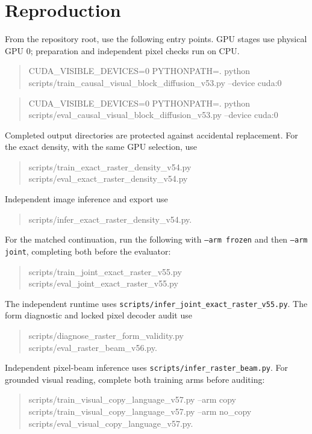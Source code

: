 \documentclass[10pt,a4paper]{article}
\begin{document}
\section*{Reproduction}
From the repository root, use the following entry points. GPU stages use
physical GPU 0; preparation and independent pixel checks run on CPU.
\begin{quote}\small\ttfamily
CUDA\_VISIBLE\_DEVICES=0 PYTHONPATH=. python\\
scripts/train\_causal\_visual\_block\_diffusion\_v53.py --device cuda:0
\end{quote}
\begin{quote}\small\ttfamily
CUDA\_VISIBLE\_DEVICES=0 PYTHONPATH=. python\\
scripts/eval\_causal\_visual\_block\_diffusion\_v53.py --device cuda:0
\end{quote}
Completed output directories are protected against accidental replacement.
For the exact density, with the same GPU selection, use
\begin{quote}\small\ttfamily
scripts/train\_exact\_raster\_density\_v54.py\\
scripts/eval\_exact\_raster\_density\_v54.py
\end{quote}
Independent image inference and export use
\begin{quote}\small\ttfamily
scripts/infer\_exact\_raster\_density\_v54.py.
\end{quote}
For the matched continuation, run the following with \texttt{--arm frozen}
and then \texttt{--arm joint}, completing both before the evaluator:
\begin{quote}\small\ttfamily
scripts/train\_joint\_exact\_raster\_v55.py\\
scripts/eval\_joint\_exact\_raster\_v55.py
\end{quote}
The independent runtime uses
\texttt{scripts/infer\_joint\_exact\_raster\_v55.py}.
The form diagnostic and locked pixel decoder audit use
\begin{quote}\small\ttfamily
scripts/diagnose\_raster\_form\_validity.py\\
scripts/eval\_raster\_beam\_v56.py.
\end{quote}
Independent pixel-beam inference uses
\texttt{scripts/infer\_raster\_beam.py}.
For grounded visual reading, complete both training arms before auditing:
\begin{quote}\small\ttfamily
scripts/train\_visual\_copy\_language\_v57.py --arm copy\\
scripts/train\_visual\_copy\_language\_v57.py --arm no\_copy\\
scripts/eval\_visual\_copy\_language\_v57.py.
\end{quote}
\end{document}
